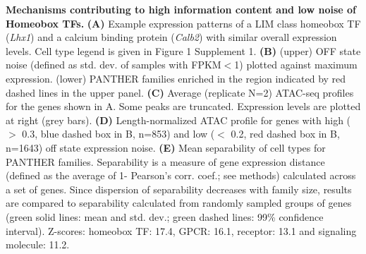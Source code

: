 \textbf{Mechanisms contributing to high information content and low noise of Homeobox TFs.}
\textbf{(A)} Example expression patterns of a LIM class homeobox TF (\textit{Lhx1}) and a calcium binding protein (\textit{Calb2}) with  similar overall expression levels. Cell type legend is given in Figure 1 Supplement 1.
\textbf{(B)} (upper) OFF state noise (defined as std. dev. of samples with FPKM$<$1) plotted against maximum expression. (lower) PANTHER families enriched in the region indicated by red dashed lines in the upper panel.
\textbf{(C)} Average (replicate N=2) ATAC-seq profiles for the genes shown in A. Some peaks are truncated. Expression levels are plotted at right (grey bars).
\textbf{(D)} Length-normalized ATAC profile for genes with high ($>$ 0.3, blue dashed box in B, n=853) and low ($<$ 0.2, red dashed box in B, n=1643) off state expression noise.
\textbf{(E)} Mean separability of cell types for PANTHER families. Separability is a measure of gene expression distance (defined as the average of 1- Pearson's corr. coef.; see methods) calculated across a set of genes. Since dispersion of separability decreases with family size, results are compared to separability calculated from randomly sampled groups of genes (green solid lines: mean and std. dev.; green dashed lines: 99\% confidence interval). Z-scores: homeobox TF: 17.4, GPCR: 16.1, receptor: 13.1 and signaling molecule: 11.2. 
